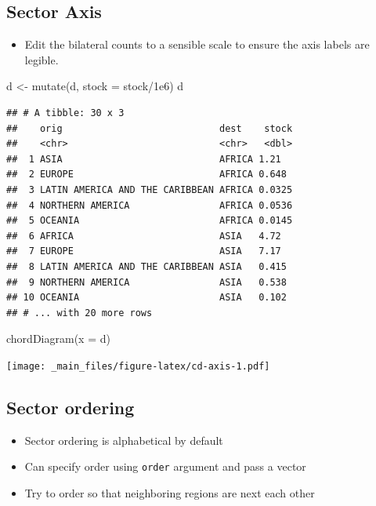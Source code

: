 \documentclass[
]{book}
\newenvironment{Shaded}{\begin{snugshade}}{\end{snugshade}}
\newcommand{\AttributeTok}[1]{\textcolor[rgb]{0.77,0.63,0.00}{#1}}
\newcommand{\FloatTok}[1]{\textcolor[rgb]{0.00,0.00,0.81}{#1}}
\newcommand{\FunctionTok}[1]{\textcolor[rgb]{0.00,0.00,0.00}{#1}}
\newcommand{\NormalTok}[1]{#1}
\newcommand{\OtherTok}[1]{\textcolor[rgb]{0.56,0.35,0.01}{#1}}
\newcommand{\SpecialCharTok}[1]{\textcolor[rgb]{0.00,0.00,0.00}{#1}}
\providecommand{\tightlist}{%
  \setlength{\itemsep}{0pt}\setlength{\parskip}{0pt}}
\begin{document}
\hypertarget{sector-axis}{%
\subsection{Sector Axis}\label{sector-axis}}

\begin{itemize}
\tightlist
\item
  Edit the bilateral counts to a sensible scale to ensure the axis labels are legible.
\end{itemize}

\begin{Shaded}
\begin{Highlighting}[]
\NormalTok{d }\OtherTok{\textless{}{-}} \FunctionTok{mutate}\NormalTok{(d, }\AttributeTok{stock =}\NormalTok{ stock}\SpecialCharTok{/}\FloatTok{1e6}\NormalTok{)}
\NormalTok{d}
\end{Highlighting}
\end{Shaded}

\begin{verbatim}
## # A tibble: 30 x 3
##    orig                            dest    stock
##    <chr>                           <chr>   <dbl>
##  1 ASIA                            AFRICA 1.21  
##  2 EUROPE                          AFRICA 0.648 
##  3 LATIN AMERICA AND THE CARIBBEAN AFRICA 0.0325
##  4 NORTHERN AMERICA                AFRICA 0.0536
##  5 OCEANIA                         AFRICA 0.0145
##  6 AFRICA                          ASIA   4.72  
##  7 EUROPE                          ASIA   7.17  
##  8 LATIN AMERICA AND THE CARIBBEAN ASIA   0.415 
##  9 NORTHERN AMERICA                ASIA   0.538 
## 10 OCEANIA                         ASIA   0.102 
## # ... with 20 more rows
\end{verbatim}

\begin{Shaded}
\begin{Highlighting}[]
\FunctionTok{chordDiagram}\NormalTok{(}\AttributeTok{x =}\NormalTok{ d)}
\end{Highlighting}
\end{Shaded}

\texttt{[image: \_main\_files/figure-latex/cd-axis-1.pdf]}

\hypertarget{sector-ordering}{%
\subsection{Sector ordering}\label{sector-ordering}}

\begin{itemize}
\tightlist
\item
  Sector ordering is alphabetical by default
\item
  Can specify order using \texttt{order} argument and pass a vector
\item
  Try to order so that neighboring regions are next each other
\end{itemize}
\end{document}
